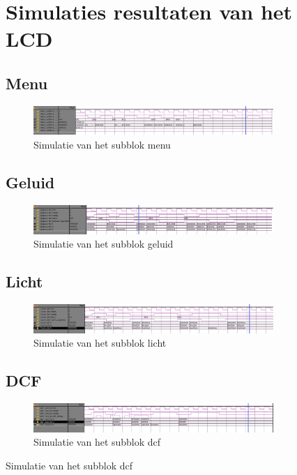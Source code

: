 \begin{figure}[ht!]
\chapter[Simulatie resultaten LCD]{Simulaties resultaten van het LCD}
\label{Ap:sim_LCD}
\section{Menu}
\begin{figure}[h!]
\includegraphics[width=\textwidth,height=\textheight,keepaspectratio]{Figuren/LCD/resultaten/menu.jpg}
\caption{Simulatie van het subblok menu}
\label{fig:simmenu}
\end{figure}
\section{Geluid}
\begin{figure}[h!]
\includegraphics[width=\textwidth,height=\textheight,keepaspectratio]{Figuren/LCD/resultaten/geluid.jpg}
\caption{Simulatie van het subblok geluid}
\label{fig:simgeluid}
\end{figure}
\section{Licht}
\begin{figure}[h!]
\includegraphics[width=\textwidth,height=\textheight,keepaspectratio]{Figuren/LCD/resultaten/licht.jpg}
\caption{Simulatie van het subblok licht}
\label{fig:simlicht}
\end{figure}
\section{DCF}
\begin{figure}[h!]
\includegraphics[width=\textwidth,height=\textheight,keepaspectratio]{Figuren/LCD/resultaten/dcf.jpg}
\caption{Simulatie van het subblok dcf}
\label{fig:simdcf}
\end{figure}


\end{figure}
